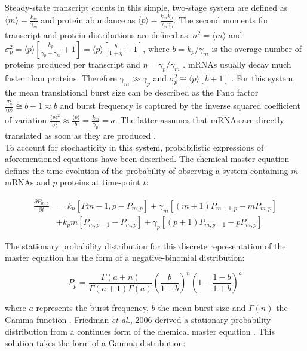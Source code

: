 \doublespacing
\noindent Steady-state transcript counts in this simple, two-stage system are defined as $\langle{}m\rangle{}=\frac{k_m}{\gamma_m}$  and protein abundance as $\langle{}p\rangle{}=\frac{k_mk_p}{\gamma_m\gamma_p }$. The second moments for transcript and protein distributions are defined as: $\sigma^2=\langle{}m\rangle{}$ and $\sigma_p^2=\langle{}p\rangle{}\left[\frac{k_p}{\gamma_p+\gamma_m}+1\right]=\langle{}p\rangle{}\left[\frac{b}{1+\eta}+1\right]$, where $b=k_p/\gamma_m$  is the average number of proteins produced per transcript and $\eta=\gamma_p/\gamma_m$  \citep{Tsimring2014, Thattai2001}. mRNAs usually decay much faster than proteins. Therefore $\gamma_m\gg{}\gamma_p$ and $\sigma_p^2\cong\langle{}p\rangle{}\left[b+1\right]$ \citep{Thattai2001}. For this system, the mean translational burst size can be described as the Fano factor $\frac{\sigma_p^2}{\langle{}p\rangle}\cong{}b+1\approx{}b$ and burst frequency is captured by the inverse squared coefficient of variation $\frac{\langle{}p\rangle{}^2}{\sigma_p^2}\approx{}\frac{\langle{}p\rangle{}}{b}=\frac{k_m}{\gamma_p}=a$. The latter assumes that mRNAs are directly translated as soon as they are produced \citep{Friedman2006}.\\

\onehalfspacing
\noindent To account for stochasticity in this system, probabilistic expressions of aforementioned equations have been described. The chemical master equation defines the time-evolution of the probability of observing a system containing $m$ mRNAs and $p$ proteins at time-point $t$:

\begin{align}
\frac{\partial{}P_{m,p}}{\partial{}t}&=k_n\left[P{m-1,p}-P_{m,p}\right]+\gamma_m\left[(m+1)P_{m+1,p}-mP_{m,p}\right] \nonumber \\
&+k_pm\left[P_{m,p-1}-P_{m,p}\right]+\gamma_p\left[(p+1)P_{m,p+1}-pP_{m,p}\right]
\end{align}

\noindent The stationary probability distribution for this discrete representation of the master equation has the form of a negative-binomial distribution:

\begin{equation}
P_p=\frac{\Gamma(a+n)}{\Gamma(n+1)\Gamma(a)}\left(\frac{b}{1+b}\right)^n\left(1-\frac{1-b}{1+b}\right)^a
\end{equation}

\noindent where $a$ represents the burst frequency, $b$ the mean burst size and $\Gamma(n)$ the Gamma function \citep{Shahrezaei2008}. Friedman \textit{et al.}, 2006 derived a stationary probability distribution from a continues form of the chemical master equation \citep{Friedman2006}. This solution takes the form of a Gamma distribution:

